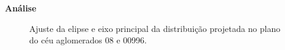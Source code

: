 \documentclass[xcolor=dvipsnames,10pt]{beamer}
\begin{document}
\begin{frame}{\textbf{Análise}}
  \begin{figure}[!htbp]
    \centering
    \caption{Ajuste da elipse e eixo principal da distribuição projetada no plano do céu aglomerados 08 e 00996.}
  \end{figure}
\end{frame}
\end{document}
